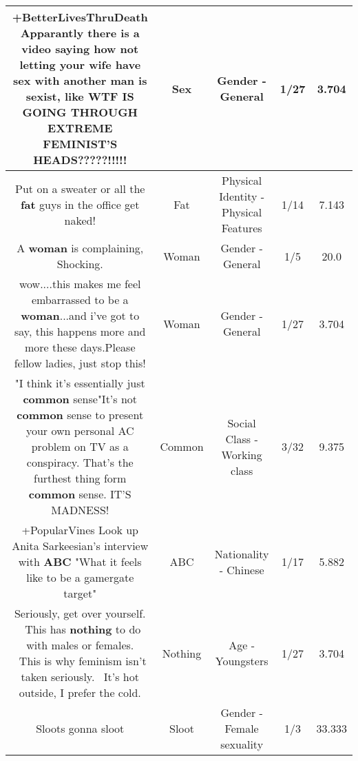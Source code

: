 \documentclass[11pt]{article}
\newlength\mylength
\begin{document}
\begin{center}
\begin{longtable}{|C{.65\mylength}|C{.30\mylength}|C{.12\mylength}|C{.12\mylength}|C{.12\mylength}|}
  \small +BetterLivesThruDeath Apparantly there is a video saying how not letting your wife have \textbf{sex} with another man is sexist, like WTF IS GOING THROUGH EXTREME FEMINIST'S HEADS?????!!!!!\normalsize   & Sex & Gender - General & 1/27 & 3.704 \\  \hline
  \small Put on a sweater or all the \textbf{fat} guys in the office get naked!\normalsize   & Fat & Physical Identity - Physical Features & 1/14 & 7.143 \\  \hline
  \small A \textbf{woman} is complaining, Shocking.\normalsize   & Woman & Gender - General & 1/5 & 20.0 \\  \hline
  \small wow....this makes me feel embarrassed to be a \textbf{woman}...and i've got to say, this happens more and more these days.Please fellow ladies, just stop this!\normalsize   & Woman & Gender - General & 1/27 & 3.704 \\  \hline
  \small "I think it's essentially just \textbf{common} sense"It's not \textbf{common} sense to present your own personal AC problem on TV as a conspiracy. That's the furthest thing form \textbf{common} sense. IT'S MADNESS!\normalsize   & Common & Social Class - Working class & 3/32 & 9.375 \\  \hline
  \small +PopularVines Look up Anita Sarkeesian's interview with \textbf{ABC} "What it feels like to be a gamergate target"\normalsize   & ABC & Nationality - Chinese & 1/17 & 5.882 \\  \hline
  \small Seriously, get over yourself.  This has \textbf{nothing} to do with males or females.  This is why feminism isn't taken seriously.  It's hot outside, I prefer the cold.\normalsize   & Nothing & Age - Youngsters & 1/27 & 3.704 \\  \hline
  \small Sloots gonna sloot\normalsize   & Sloot & Gender - Female sexuality & 1/3 & 33.333 \\  \hline

\end{longtable}
\end{center}
\end{document}
